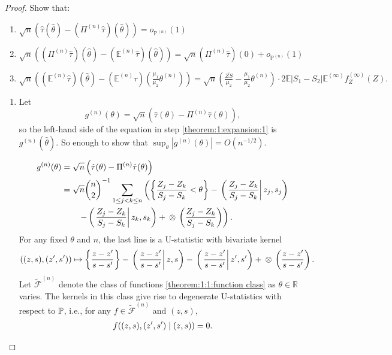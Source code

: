 \documentclass[12pt]{article}
\newcommand{\z}{Z}
\newcommand{\s}{S}
\newcommand{\zs}[2]{\frac{\z_{#1}-\z_{#2}}{\s_{#1}-\s_{#2}}}
\let\n\relax
\newcommand{\n}[1]{{#1}^{(n)}}
\newcommand{\gn}{g^{(n)}}
\newcommand{\Pin}{\Pi^{(n)}}
\newcommand{\EE}{\mathbb{E}}
\newcommand{\EEn}{\mathbb{E}^{(n)}}
\newcommand{\EEinf}{\mathbb{E}^{(\infty)}}
\newcommand{\Pn}{P^{(n)}}
\newcommand{\PP}{\mathbb{P}}
\newcommand{\PPn}{\mathbb{P}^{(n)}}
\newcommand{\FFn}{\tilde{\mathcal{F}}^{(n)}}
\newcommand{\thetan}{\theta^{(n)}}
\let\P\relax
\newcommand{\P}{P}
\begin{document}
\begin{proof}
Show that:
\begin{enumerate}
\item \label{theorem:1:expansion:1}$ \sqrt{n}\left(\hat\tau(\hat\theta) - (\Pin\hat\tau)(\hat\theta) \right)=o_{\PPn}(1)$
\item \label{theorem:1:expansion:2}$\sqrt{n}((\Pin\hat\tau)(\hat\theta) - (\EEn\hat\tau)(\hat\theta))=\sqrt{n}(\Pin\hat\tau)(0)+o_{\PPn}(1)$
\item \label{theorem:1:expansion:3}$\sqrt{n}\left( (\EEn\hat\tau)(\hat\theta) - (\EEn\hat\tau)\left(\frac{\mu_1}{\mu_2}\thetan\right)\right)=\sqrt{n}\left(\frac{\overline{\z\s}}{\mu_2}-\frac{\mu_1}{\mu_2}\thetan\right)\cdot 2 \EE|\s_1-\s_2|\EEinf f_{\z}^{(\infty)}(\z).$
\end{enumerate}




\begin{enumerate}[wide, labelwidth=!, labelindent=0pt]


\item \label{theorem:1:1}

Let $$\gn(\theta)=\sqrt{n}\left(\hat\tau(\theta)-\Pin\hat\tau(\theta)\right),$$ so the left-hand side of the equation in step \ref{theorem:1:expansion:1} is $\gn(\hat\theta)$. So enough to show that $\sup_\theta |\gn(\theta)|=O(n^{-1/2}).$


\begin{align}
  \gn(\theta)&=\sqrt{n}\left(\hat\tau(\theta)-\Pin\hat\tau(\theta)\right)\\
             &=\sqrt{n}{n\choose 2}^{-1}\sum_{1\le j<k\le n}\left(
               \left\{\zs{j}{k}<\theta\right\}
               - \n{\P}\left(\left.\zs{j}{k}\right|z_j,s_j\right)
               \right.\\&\left.\qquad
               - \n{\P}\left(\left.\zs{j}{k}\right|z_k,s_k\right)
               + \n{\P}\otimes\n{\P}\left(\zs{j}{k}\right)
               \right).
\end{align}
For any fixed $\theta$ and $n$, the last line is a U-statistic with bivariate kernel
\begin{align}
  ((z,s),(z',s')) \mapsto \left\{\frac{z-z'}{s-s'}\right\} - \n{\P}\left(\left.\frac{z-z'}{s-s'}\right|z,s\right)
  - \n{\P}\left(\left.\frac{z-z'}{s-s'}\right|z',s'\right) + \n{\P}\otimes\n{\P}\left(\frac{z-z'}{s-s'}\right).
  \label{theorem:1:1:function class}
\end{align}
Let $\FFn$ denote the class of functions \eqref{theorem:1:1:function class} as $\theta\in\mathbb{R}$ varies. The kernels in this class give rise to degenerate U-statistics with respect to $\n{\PP}$, i.e., for any $f\in\FFn$ and $(z,s)$,
\begin{align}
  \n{\P} f((z,s),(z',s')\mid (z,s))=0.
\end{align}


\end{enumerate}
\end{proof}
\end{document}
